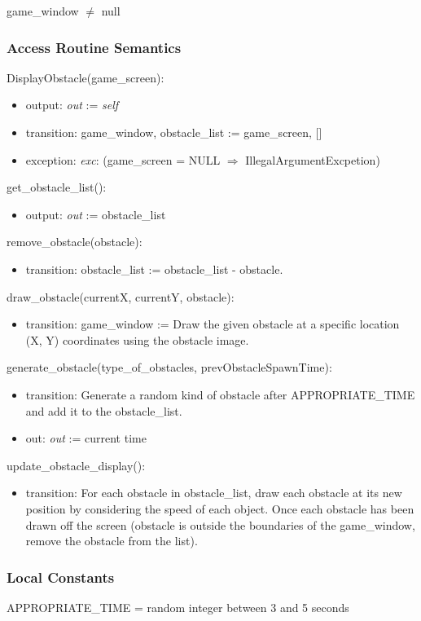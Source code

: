 \documentclass[12pt]{article}
\begin{document}
game\_window $\neq$ null

\subsubsection* {Access Routine Semantics}

   DisplayObstacle(game\_screen):
\begin{itemize}
    \item output: \textit{out} := \textit{self}
    \item transition: game\_window, obstacle\_list := game\_screen, []
    \item exception: \textit{exc}: (game\_screen = NULL $\Rightarrow$ IllegalArgumentExcpetion)
\end{itemize}
\noindent get\_obstacle\_list():
\begin{itemize}
    \item output: \textit{out} := obstacle\_list
\end{itemize}
\noindent remove\_obstacle(obstacle): 
\begin{itemize}
    \item transition: obstacle\_list := obstacle\_list - obstacle.
\end{itemize}
\noindent draw\_obstacle(currentX, currentY, obstacle): 
\begin{itemize}
    \item transition: game\_window := Draw the given obstacle at a specific location (X, Y) coordinates using the obstacle image.
\end{itemize}
\noindent generate\_obstacle(type\_of\_obstacles, prevObstacleSpawnTime):
\begin{itemize}
    \item transition: Generate a random kind of obstacle after APPROPRIATE\_TIME and add it to the obstacle\_list. 
    \item out: \textit{out} := current time
\end{itemize}
\noindent update\_obstacle\_display(): 
\begin{itemize}
    \item transition: For each obstacle in obstacle\_list, draw each obstacle at its new position by considering the speed of each object. Once each obstacle has been drawn off the screen (obstacle is outside the boundaries of the game\_window, remove the obstacle from the list).
\end{itemize}

\subsubsection* {Local Constants}
APPROPRIATE\_TIME = random integer between 3 and 5 seconds
\newpage 
\end{document}
